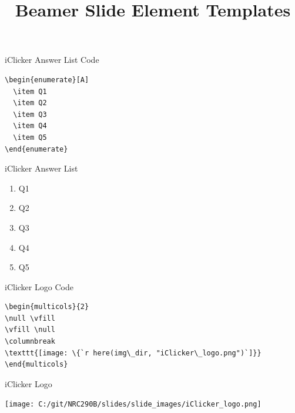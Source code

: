 \documentclass[
  ignorenonframetext,
]{beamer}
\title{Beamer Slide Element Templates}
\author{}
\date{\vspace{-2.5em}}
\begin{document}
\frame{\titlepage}

\begin{frame}[fragile]{iClicker Answer List Code}
\protect\hypertarget{iclicker-answer-list-code}{}

\begin{verbatim}
\begin{enumerate}[A]
  \item Q1
  \item Q2
  \item Q3
  \item Q4
  \item Q5
\end{enumerate}
\end{verbatim}

\end{frame}

\begin{frame}{iClicker Answer List}
\protect\hypertarget{iclicker-answer-list}{}

\begin{enumerate}[A]
\item Q1
\item Q2
\item Q3
\item Q4
\item Q5
\end{enumerate}

\end{frame}

\begin{frame}[fragile]{iClicker Logo Code}
\protect\hypertarget{iclicker-logo-code}{}

\begin{verbatim}
\begin{multicols}{2}
\null \vfill
\vfill \null
\columnbreak
\texttt{[image: \{`r here(img\_dir, "iClicker\_logo.png")`]}}
\end{multicols}
\end{verbatim}

\end{frame}

\begin{frame}{iClicker Logo}
\protect\hypertarget{iclicker-logo}{}

\begin{multicols}{2}
\null \vfill
\vfill \null
\columnbreak
\texttt{[image: C:/git/NRC290B/slides/slide\_images/iClicker\_logo.png]}
\end{multicols}

\end{frame}
\end{document}
